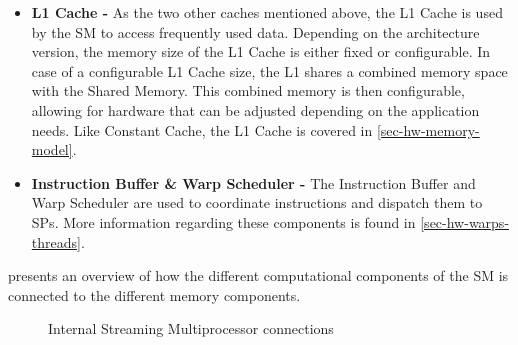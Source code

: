 \begin{itemize}
	
	\item \textbf{L1 Cache -} As the two other caches mentioned above, the L1 Cache is used by the SM to access frequently used data. 
	Depending on the architecture version, the memory size of the L1 Cache is either fixed or configurable.
	In case of a configurable L1 Cache size, the L1 shares a combined memory space with the Shared Memory.
	This combined memory is then configurable, allowing for hardware that can be adjusted depending on the application needs. Like Constant Cache, the L1 Cache is covered in \cref{sec-hw-memory-model}.

	\item  \textbf{Instruction Buffer \& Warp Scheduler -} The Instruction Buffer and Warp Scheduler are used to coordinate instructions and dispatch them to SPs.
	More information regarding these components is found in \cref{sec-hw-warps-threads}.
		
\end{itemize}

 presents an overview of how the different computational components of the SM is connected to the different memory components.

\begin{figure}[H]
	\centering
	\caption{Internal Streaming Multiprocessor connections}
	\label{fig:hw-sm-inside}
\end{figure}
